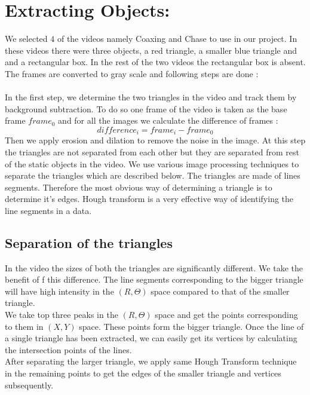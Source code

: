 \def\DevnagVersion{2.15}\documentclass[a4paper, 10pt, notitlepage]{report}
\begin{document}
\section{Extracting Objects: }
We selected $4$ of the videos namely Coaxing and Chase to use in our project. In these videos there were three objects, a red triangle, a smaller blue triangle and and a rectangular box. In the rest of the two videos the rectangular box is absent.\\
The frames are converted to gray scale and following steps are done :\\
\\ \hspace*{10pt} In the first step, we determine the two triangles in the video and track them by background subtraction. To do so one frame of the video is taken as the base frame $frame_0$ and for all the images we calculate the difference of frames :
	$$difference_i = frame_i - frame_0$$
Then we apply erosion and dilation to remove the noise in the image. At this step the triangles are not separated from each other but they are separated from rest of the static objects in the video. We use various image processing techniques to separate the triangles which are described below.
\hspace*{10pt} The triangles are made of lines segments. Therefore the most obvious way of determining a triangle is to determine it's edges. Hough transform is a very effective way of identifying the line segments in a data.\\

\subsection{Separation of the triangles}
\hspace*{10pt} In the video the sizes of both the triangles are significantly different. We take the benefit of f this difference. The line segments corresponding to the bigger triangle will have high intensity in the $(R, \Theta)$ space compared to that of the smaller triangle.\\
\hspace*{10pt} We take top three peaks in the $(R, \Theta)$ space and get the points corresponding to them in $(X,Y)$ space. These points form the bigger triangle. Once the line of a single triangle has been extracted, we can easily get its vertices by calculating the intersection points of the lines.\\
\hspace*{10pt} After separating the larger triangle, we apply same Hough Transform technique in the remaining points to get the edges of the smaller triangle and vertices subsequently.\\
\end{document}
